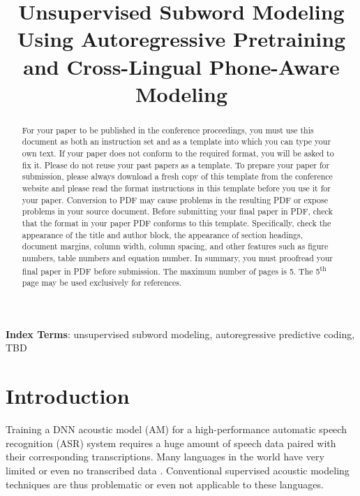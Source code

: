 \documentclass[a4paper]{article}
\title{Unsupervised Subword Modeling Using Autoregressive Pretraining and Cross-Lingual Phone-Aware Modeling}
\begin{document}
\maketitle
% 
\begin{abstract}
  For your paper to be published in the conference proceedings, you must use this document as both an instruction set and as a template into which you can type your own text. If your paper does not conform to the required format, you will be asked to fix it.
  Please do not reuse your past papers as a template. To prepare your paper for submission, please always download a fresh copy of this template from the conference website and please read the format instructions in this template before you use it for your paper.
  Conversion to PDF may cause problems in the resulting PDF or expose problems in your source document. Before submitting your final paper in PDF, check that the format in your paper PDF conforms to this template. Specifically, check the appearance of the title and author block, the appearance of section headings, document margins, column width, column spacing, and other features such as figure numbers, table numbers and equation number. In summary, you must proofread your final paper in PDF before submission.
    The maximum number of pages is 5. The 5\textsuperscript{th} page may be used exclusively for references. 

\end{abstract}
\noindent\textbf{Index Terms}: unsupervised subword modeling, autoregressive predictive coding, {\color{cyan}TBD}

\section{Introduction}

Training a DNN acoustic model (AM) for a high-performance automatic speech recognition (ASR) system requires a huge amount of speech data paired with their corresponding transcriptions. 
Many languages in the world have very limited or even no transcribed data \cite{dunbar2017zero}. 
Conventional supervised acoustic modeling techniques are thus problematic or even not applicable to these languages.
\end{document}
